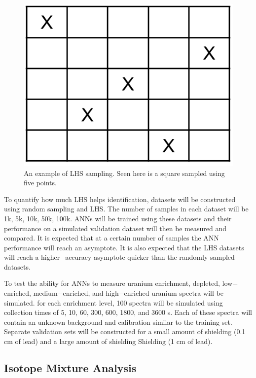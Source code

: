 \documentclass[tocnosub,noragright,centerchapter,12pt,fullpage]{uiucecethesis09}
\begin{document}
\begin{figure}[H]
\centering
\includegraphics[width=0.4\linewidth]{images/LHS_example}
\caption{An example of LHS sampling. Seen here is a square sampled using five points.}
\label{fig:LHS_example}
\end{figure}

To quantify how much LHS helps identification, datasets will be constructed using random sampling and LHS. The number of samples in each dataset will be 1k, 5k, 10k, 50k, 100k. ANNs will be trained using these datasets and their  performance on a simulated validation dataset will then be measured and compared. It is expected that at a certain number of samples the ANN performance will reach an asymptote. It is also expected that the LHS datasets will reach a higher$-$accuracy asymptote quicker than the randomly sampled datasets. 


To test the ability for ANNs to measure uranium enrichment, depleted, low$-$enriched, medium$-$enriched, and high$-$enriched uranium spectra will be simulated. for each enrichment level, 100 spectra will be simulated using collection times of 5, 10, 60, 300, 600, 1800, and 3600 s. Each of these spectra will contain an unknown background and calibration similar to the training set. Separate validation sets will be constructed for a small amount of shielding (0.1 cm of lead) and a large amount of shielding Shielding (1 cm of lead). 





\iffalse
\subsection{Isotope Mixture Analysis}

\end{document}
